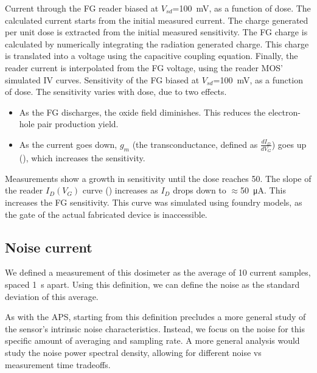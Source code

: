 {Current through the FG reader biased at 
    $V_{sd}$=\SI{100}{\milli\volt}, as a function of dose.
The calculated current starts from the initial measured current.
The charge generated per unit dose is extracted from the initial measured sensitivity.
The FG charge is calculated by numerically integrating the radiation generated charge.
This charge is translated into a voltage using the capacitive coupling equation.
Finally, the reader current is interpolated from the FG voltage,
using the reader MOS' simulated IV curves.}
{Sensitivity of the FG biased at 
    $V_{sd}$=\SI{100}{\milli\volt}, as a function of dose.
}
The sensitivity varies with dose, due to two effects.
\begin{itemize}
    \item As the FG discharges, the oxide field diminishes.
        This reduces the electron-hole pair production yield.
    \item As the current goes down, $g_m$ (the transconductance, defined as $\frac{dI_D}{dV_G}$) goes up
        (), which increases the sensitivity.
\end{itemize}
Measurements show a growth in sensitivity until the dose reaches
\SI{50}{\Gray}.
{The slope of the reader $I_D(V_G)$ curve () 
increases as $I_D$ drops down to 
$\approx$\SI{50}{\micro\ampere}.
This increases the FG sensitivity.
This curve was simulated using foundry models,
as the gate of the actual fabricated device is inaccessible.
}
\subsection{Noise current}
We defined a measurement of this dosimeter as the average of 10 current samples,
spaced \SI{1}{\second} apart.
Using this definition, we can define the noise as the standard deviation of this average.

As with the APS, starting from this definition precludes a more general study
of the sensor's intrinsic noise characteristics.
Instead, we focus on the noise for this specific amount of averaging and sampling rate.
A more general analysis would study the noise power spectral density,
allowing for different noise vs measurement time tradeoffs.

